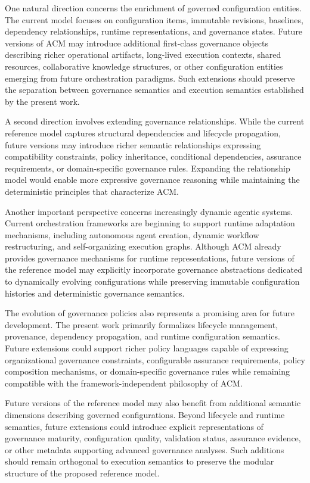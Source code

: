 \documentclass[10pt]{article}
\begin{document}
One natural direction concerns the enrichment of governed configuration entities. The current model focuses on configuration items, immutable revisions, baselines, dependency relationships, runtime representations, and governance states. Future versions of ACM may introduce additional first-class governance objects describing richer operational artifacts, long-lived execution contexts, shared resources, collaborative knowledge structures, or other configuration entities emerging from future orchestration paradigms. Such extensions should preserve the separation between governance semantics and execution semantics established by the present work.

A second direction involves extending governance relationships. While the current reference model captures structural dependencies and lifecycle propagation, future versions may introduce richer semantic relationships expressing compatibility constraints, policy inheritance, conditional dependencies, assurance requirements, or domain-specific governance rules. Expanding the relationship model would enable more expressive governance reasoning while maintaining the deterministic principles that characterize ACM.

Another important perspective concerns increasingly dynamic agentic systems. Current orchestration frameworks are beginning to support runtime adaptation mechanisms, including autonomous agent creation, dynamic workflow restructuring, and self-organizing execution graphs. Although ACM already provides governance mechanisms for runtime representations, future versions of the reference model may explicitly incorporate governance abstractions dedicated to dynamically evolving configurations while preserving immutable configuration histories and deterministic governance semantics.

The evolution of governance policies also represents a promising area for future development. The present work primarily formalizes lifecycle management, provenance, dependency propagation, and runtime configuration semantics. Future extensions could support richer policy languages capable of expressing organizational governance constraints, configurable assurance requirements, policy composition mechanisms, or domain-specific governance rules while remaining compatible with the framework-independent philosophy of ACM.

Future versions of the reference model may also benefit from additional semantic dimensions describing governed configurations. Beyond lifecycle and runtime semantics, future extensions could introduce explicit representations of governance maturity, configuration quality, validation status, assurance evidence, or other metadata supporting advanced governance analyses. Such additions should remain orthogonal to execution semantics to preserve the modular structure of the proposed reference model.
\end{document}
